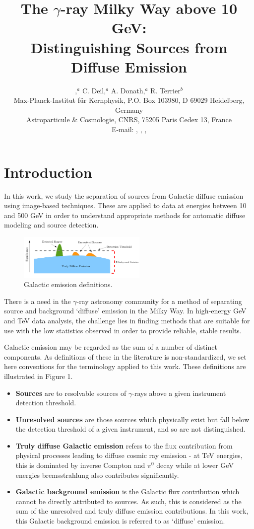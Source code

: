 \documentclass{PoS}
\title{The $\gamma$-ray Milky Way above 10 GeV:\\
Distinguishing Sources from Diffuse Emission}
\author{\speaker{E. Owen},$^a$ C. Deil,$^{a}$ A. Donath,$^{a}$ R. Terrier$^{b}$\\
\llap{$^a$}Max-Planck-Institut f\"{u}r Kernphysik, P.O. Box 103980, D
69029 Heidelberg, Germany\\
\llap{$^b$}Astroparticule \& Cosmologie, CNRS, 75205 Paris Cedex 13, France\\
E-mail: \email{ellis.owen@mpi-hd.mpg.de}, \email{christoph.deil@mpi-hd.mpg.de}, \email{axel.donath@mpi-hd.mpg.de}, \email{terrier@apc.univ-paris7.fr}}
\begin{document}
\section{Introduction}

In this work, we study the separation of sources from Galactic diffuse emission using image-based techniques. These are applied to data at energies between 10 and 500 GeV in order to understand appropriate methods for automatic diffuse modeling and source detection.

\begin{figure}
\vspace{-10pt}
  \centering
      \includegraphics[width=0.55\textwidth]{figures/definitions.png}
  \caption{Galactic emission definitions.}
\vspace{-15pt}
\end{figure}

There is a need in the $\gamma$-ray astronomy community for a method of separating source and background `diffuse' emission in the Milky Way. In high-energy GeV and TeV data analysis, the challenge lies in finding methods that are suitable for use with the low statistics observed in order to provide reliable, stable results.

Galactic emission may be regarded as the sum of a number of distinct components. As definitions of these in the literature is non-standardized, we set here conventions for the terminology applied to this work. These definitions are illustrated in Figure 1.

\begin{itemize}[noitemsep,nolistsep]
\item \textbf{Sources} are to resolvable sources of $\gamma$-rays above a given instrument detection threshold.
\item \textbf{Unresolved sources} are those sources which physically exist but fall below the detection threshold of a given instrument, and so are not distinguished.
\item \textbf{Truly diffuse Galactic emission} refers to the flux contribution from physical processes leading to diffuse cosmic ray emission - at TeV energies, this is dominated by inverse Compton and $\pi^0$ decay while at lower GeV energies bremsstrahlung also contributes significantly.
\item \textbf{Galactic background emission} is the Galactic flux contribution which cannot be directly attributed to sources. As such, this is considered as the sum of the unresolved and truly diffuse emission contributions. In this work, this Galactic background emission is referred to as `diffuse' emission.
\end{itemize}
\end{document}
